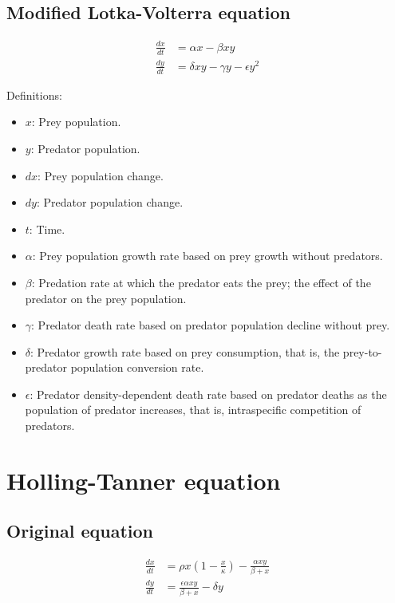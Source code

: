 \subsection{Modified Lotka-Volterra equation}
\begin{align*}
\frac{dx}{dt} &= \alpha x - \beta x y \\
\frac{dy}{dt} &= \delta x y -\gamma y - \epsilon y^2
\end{align*}

Definitions:
\begin{itemize}
\item $x$: Prey population.
\item $y$: Predator population.
\item $dx$: Prey population change.
\item $dy$: Predator population change.
\item $t$: Time.
\item $\alpha$: Prey population growth rate based on prey growth without predators.
\item $\beta$: Predation rate at which the predator eats the prey; the effect of the predator on the prey population.
\item $\gamma$: Predator death rate based on predator population decline without prey.
\item $\delta$: Predator growth rate based on prey consumption, that is, the prey-to-predator population conversion rate.
\item $\epsilon$: Predator density-dependent death rate based on predator deaths as the population of predator increases, that is, intraspecific competition of predators.
\end{itemize}

\section{Holling-Tanner equation}
\subsection{Original equation}
\begin{align*}
\frac{dx}{dt} &= \rho x \left(1 - \frac{x}{\kappa}\right) - \frac{\alpha xy}{\beta + x} \\
\frac{dy}{dt} &= \frac{\epsilon \alpha xy}{\beta + x} - \delta y
\end{align*}

